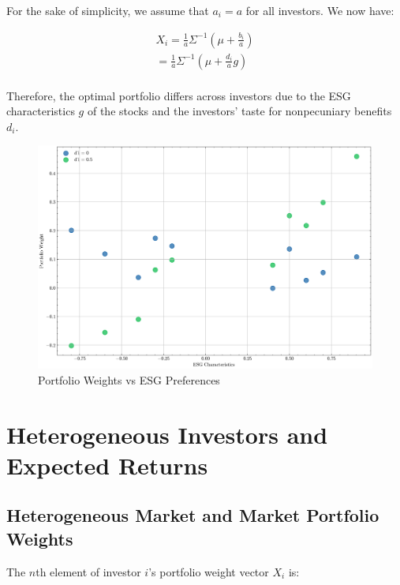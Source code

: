 For the sake of simplicity, we assume that $a_i = a$ for all investors.
We now have:

\begin{equation}
    \begin{aligned}
    X_i = \frac{1}{a} \Sigma^{-1}(\mu + \frac{b_i}{a}) \\
    = \frac{1}{a} \Sigma^{-1}(\mu + \frac{d_i}{a}g) \\
    \end{aligned}
\end{equation}

Therefore, the optimal portfolio differs across investors due to the
ESG characteristics $g$ of the stocks and the investors' taste for
nonpecuniary benefits $d_i$. 


\begin{figure}
    \centering
    \includegraphics[width=1\textwidth]{../images/chapter02/portfolio_weights_vs_esg.png}
    \caption{Portfolio Weights vs ESG Preferences}
    \label{fig:esg_taste}
\end{figure}

\newpage

\section{Heterogeneous Investors and Expected Returns}


\subsection{Heterogeneous Market and Market Portfolio Weights}

The $n$th element of investor $i$'s portfolio weight vector $X_i$ is:

